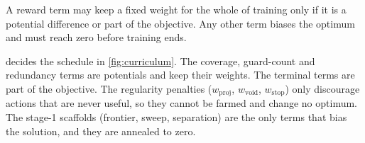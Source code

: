 \documentclass[11pt,a4paper]{article}
\begin{document}
\begin{designrule}\label{rule:anneal}
A reward term may keep a fixed weight for the whole of training only if it is a potential
difference or part of the objective. Any other term biases the optimum and must reach zero
before training ends.
\end{designrule}

 decides the schedule in \cref{fig:curriculum}. The coverage,
guard-count and redundancy terms are potentials and keep their weights. The terminal terms
are part of the objective. The regularity penalties ($w_{\mathrm{proj}}$, $w_{\mathrm{void}}$,
$w_{\mathrm{stop}}$) only discourage actions that are never useful, so they cannot be farmed and
change no optimum. The stage-1 scaffolds (frontier, sweep, separation) are the only terms
that bias the solution, and they are annealed to zero.
\end{document}
